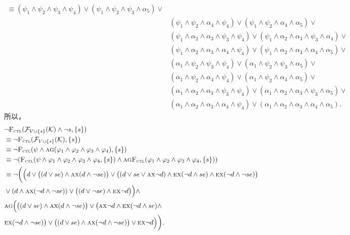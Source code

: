 \begin{example}[例1的延续]
\begin{align*}
	\equiv (\psi_1 \wedge \psi_2 \wedge \psi_3 \wedge \psi_4) \vee (\psi_1 \wedge \psi_2 \wedge \psi_3 \wedge \alpha_5) \vee\\
	& (\psi_1 \wedge \psi_2 \wedge \alpha_4 \wedge \psi_4) \vee (\psi_1 \wedge \psi_2 \wedge \alpha_4 \wedge \alpha_5) \vee\\
	& (\psi_1 \wedge \alpha_2 \wedge \alpha_3 \wedge \psi_3 \wedge \psi_4) \vee ( \psi_1 \wedge \alpha_2 \wedge \alpha_3 \wedge \psi_3 \wedge \alpha_4) \vee \\
	& ( \psi_1 \wedge \alpha_2 \wedge \alpha_3 \wedge \alpha_4 \wedge \psi_4) \vee ( \psi_1 \wedge \alpha_2 \wedge \alpha_3 \wedge \alpha_4 \wedge \alpha_5) \vee\\
	& (\alpha_1 \wedge \psi_2 \wedge \psi_3 \wedge \psi_4) \vee ( \alpha_1 \wedge \psi_2 \wedge \psi_3 \wedge \alpha_5)\vee\\
	& (\alpha_1 \wedge \psi_2 \wedge \alpha_4 \wedge \psi_4) \vee ( \alpha_1 \wedge \psi_2 \wedge \alpha_4 \wedge\alpha_5)\vee \\
	& (\alpha_1 \wedge \alpha_2 \wedge \alpha_3 \wedge \psi_3 \wedge \psi_4) \vee (\alpha_1 \wedge \alpha_2 \wedge \alpha_3\wedge \psi_3 \wedge \alpha_5) \vee \\
	& ( \alpha_1 \wedge \alpha_2 \wedge \alpha_3 \wedge \alpha_4 \wedge \psi_4) \vee ( \alpha_1 \wedge \alpha_2 \wedge \alpha_3 \wedge \alpha_4 \wedge \alpha_5).
\end{align*}
所以，
\begin{align*}
	&\neg {\textsc{F}_{\textsc{ctl}}}({\cal F}_{V\cup \{s\}}({\cal K})\wedge \neg s, \{s\}) \\
	& \equiv \neg {\textsc{F}_{\textsc{ctl}}}({\cal F}_{V\cup \{s\}}({\cal K}), \{s\})\\
	& \equiv \neg {\textsc{F}_{\textsc{ctl}}}(\psi \wedge \textsc{a} \textsc{g}(\varphi_1 \wedge \varphi_2 \wedge \varphi_3\wedge \varphi_4),\{s\})\\	
	& \equiv \neg({\textsc{F}_{\textsc{ctl}}}(\psi \wedge \varphi_1 \wedge \varphi_2 \wedge \varphi_3\wedge \varphi_4, \{s\}) \wedge \textsc{a} \textsc{g} {\textsc{F}_{\textsc{ctl}}}(\varphi_1 \wedge \varphi_2 \wedge \varphi_3\wedge \varphi_4, \{s\}))\\
	& \equiv  \neg \bigg(\Big(d \vee \big((d\vee se) \wedge \textsc{a}\textsc{x}(d \wedge \neg se)\big) \vee \big((d \vee se \vee \textsc{a}\textsc{x} \neg d) \wedge \textsc{e}\textsc{x}(\neg d \wedge se) \wedge \textsc{e}\textsc{x}(\neg d \wedge \neg se)\big) \\
	& \vee (d \wedge \textsc{a}\textsc{x}(\neg d \wedge \neg se)) \vee \big((d\vee \neg se) \wedge \textsc{e}\textsc{x}\neg d\big) \Big) \wedge\\
	& \textsc{a} \textsc{g}\Big(\big((d \vee se) \wedge \textsc{a}\textsc{x}(d \wedge \neg se)\big) \vee \big(\textsc{a}\textsc{x} \neg d \wedge \textsc{e}\textsc{x}(\neg d \wedge se) \wedge\\
	& \textsc{e}\textsc{x}(\neg d \wedge \neg se)\big) \vee \big((d\vee se) \wedge \textsc{a}\textsc{x}(\neg d \wedge \neg se)\big) \vee \textsc{e}\textsc{x} \neg d\Big)
	\bigg).
\end{align*}
\end{example}


